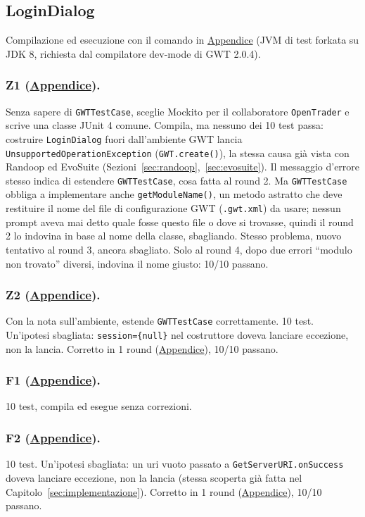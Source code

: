 \subsection{LoginDialog}

Compilazione ed esecuzione con il comando in \hyperref[cmd:test-logindialog]{Appendice} (JVM di
test forkata su JDK 8, richiesta dal compilatore dev-mode di GWT 2.0.4).

\subsubsection{Z1 (\hyperref[prompt:ld-z1]{Appendice}).}
Senza sapere di \texttt{GWTTestCase}, sceglie Mockito per il collaboratore \texttt{OpenTrader} e
scrive una classe JUnit 4 comune. Compila, ma nessuno dei 10 test passa: costruire
\texttt{LoginDialog} fuori dall'ambiente GWT lancia \texttt{UnsupportedOperationException}
(\texttt{GWT.create()}), la stessa causa già vista con Randoop ed EvoSuite
(Sezioni~\ref{sec:randoop},~\ref{sec:evosuite}). Il messaggio d'errore stesso indica di estendere
\texttt{GWTTestCase}, cosa fatta al round 2. Ma \texttt{GWTTestCase} obbliga a implementare anche
\texttt{getModuleName()}, un metodo astratto che deve restituire il nome del file di
configurazione GWT (\texttt{.gwt.xml}) da usare; nessun prompt aveva mai detto quale fosse questo
file o dove si trovasse, quindi il round 2 lo indovina in base al nome della classe, sbagliando.
Stesso problema, nuovo tentativo al round 3, ancora sbagliato. Solo al round 4, dopo due errori
``modulo non trovato'' diversi, indovina il nome giusto: 10/10 passano.

\subsubsection{Z2 (\hyperref[prompt:ld-z2]{Appendice}).}
Con la nota sull'ambiente, estende \texttt{GWTTestCase} correttamente. 10 test. Un'ipotesi
sbagliata: \texttt{session=\{null\}} nel costruttore doveva lanciare eccezione, non la lancia.
Corretto in 1 round (\hyperref[prompt:ld-z2-r2]{Appendice}), 10/10 passano.

\subsubsection{F1 (\hyperref[prompt:ld-f1]{Appendice}).}
10 test, compila ed esegue senza correzioni.

\subsubsection{F2 (\hyperref[prompt:ld-f2]{Appendice}).}
10 test. Un'ipotesi sbagliata: un uri vuoto passato a \texttt{GetServerURI.onSuccess} doveva
lanciare eccezione, non la lancia (stessa scoperta già fatta nel
Capitolo~\ref{sec:implementazione}). Corretto in 1 round
(\hyperref[prompt:ld-f2-r2]{Appendice}), 10/10 passano.

